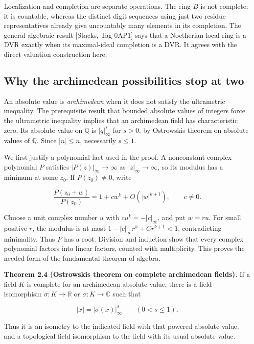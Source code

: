 \documentclass[
  english,
  11pt,
  a4paper,
]{article}
\begin{document}
Localization and completion are separate operations. The ring \(B\) is
not complete: it is countable, whereas the distinct digit sequences
using just two residue representatives already give uncountably many
elements in its completion. The general algebraic result {[}Stacks, Tag
0AP1{]} says that a Noetherian local ring is a DVR exactly when its
maximal-ideal completion is a DVR. It agrees with the direct valuation
construction here.

\subsection{Why the archimedean possibilities stop at
two}\label{NT-LOC-02--why-the-archimedean-possibilities-stop-at-two}

An absolute value is \emph{archimedean} when it does not satisfy the
ultrametric inequality. The prerequisite result that bounded absolute
values of integers force the ultrametric inequality implies that an
archimedean field has characteristic zero. Its absolute value on
\(\mathbb Q\) is \(|q|_\infty^s\) for \(s>0\), by
Ostrowski\textquotesingle s theorem on absolute values of \(\mathbb Q\).
Since \(|n|\le n\), necessarily \(s\le1\).

We first justify a polynomial fact used in the proof. A nonconstant
complex polynomial \(P\) satisfies \(|P(z)|_\infty\to\infty\) as
\(|z|_\infty\to\infty\), so its modulus has a minimum at some \(z_0\).
If \(P(z_0)\ne0\), write

\[\frac{P(z_0+w)}{P(z_0)}=1+cw^k+O(|w|^{k+1}),\qquad c\ne0.\]

Choose a unit complex number \(u\) with \(cu^k=-|c|_\infty\), and put
\(w=ru\). For small positive \(r\), the modulus is at most
\(1-|c|_\infty r^k+Cr^{k+1}<1\), contradicting minimality. Thus \(P\)
has a root. Division and induction show that every complex polynomial
factors into linear factors, counted with multiplicity. This proves the
needed form of the fundamental theorem of algebra.

\textbf{Theorem 2.4 (Ostrowski\textquotesingle s theorem on complete
archimedean fields).} If a field \(K\) is complete for an archimedean
absolute value, there is a field isomorphism \(\sigma:K\to\mathbb R\) or
\(\sigma:K\to\mathbb C\) such that

\[|x|=|\sigma(x)|_\infty^s\qquad(0<s\le1).\]

Thus it is an isometry to the indicated field with that powered absolute
value, and a topological field isomorphism to the field with its usual
absolute value.
\end{document}
